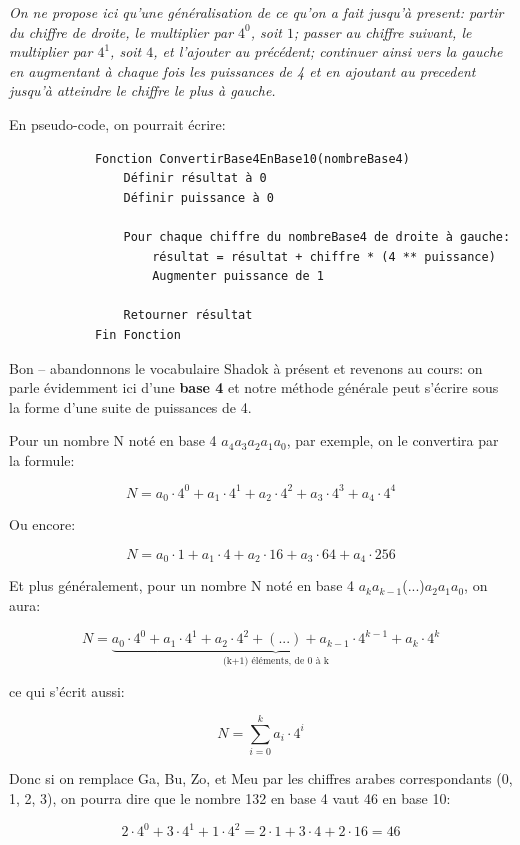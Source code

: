 \documentclass[12pt]{article}
\newenvironment{MaReponse}
		{\begin{greyedtextbox}\itshape} %
		{\end{greyedtextbox}}            %
\begin{document}
	\begin{MaReponse}
		On ne propose ici qu'une généralisation de ce qu'on a fait jusqu'à present: partir du chiffre de droite, le multiplier par $4^0$, soit $1$; passer au chiffre suivant, le multiplier par $4^1$, soit $4$, et l'ajouter au précédent; continuer ainsi vers la gauche en augmentant à chaque fois les puissances de 4 et en ajoutant au precedent jusqu'à atteindre le chiffre le plus à gauche.

		En pseudo-code, on pourrait écrire:
		
		\begin{verbatim}
			Fonction ConvertirBase4EnBase10(nombreBase4)
			    Définir résultat à 0
			    Définir puissance à 0
			
			    Pour chaque chiffre du nombreBase4 de droite à gauche:
			        résultat = résultat + chiffre * (4 ** puissance)
			        Augmenter puissance de 1
			
			    Retourner résultat
			Fin Fonction
		\end{verbatim}
	\end{MaReponse}
	
	Bon -- abandonnons le vocabulaire Shadok à présent et revenons au cours: on parle évidemment ici d'une \textbf{base 4} et notre méthode générale peut s'écrire sous la forme d'une suite de puissances de 4.
	
	Pour un nombre N noté en base 4 \( a_4 \)\( a_3 \)\( a_2 \)\( a_1 \)\( a_0 \), par exemple, on le convertira par la formule:
	
	\[ N = a_0 \cdot 4^0 + a_1 \cdot 4^1 + a_2 \cdot 4^2 + a_3 \cdot 4^3 + a_4 \cdot 4^4\]
	
	Ou encore:
	
	\[ N = a_0 \cdot 1 + a_1 \cdot 4 + a_2 \cdot 16 + a_3 \cdot 64 + a_4 \cdot 256\]
	
	Et plus généralement, pour un nombre N noté en base 4 \( a_k \)\( a_{k-1} \)(...)\( a_2 \)\( a_1 \)\( a_0 \), on aura:
	
	\[ N = \underbrace{a_0 \cdot 4^0 + a_1 \cdot 4^1 + a_2 \cdot 4^2 + (...) + a_{k-1} \cdot 4^{k-1} + a_k \cdot 4^k}_{\text{(k+1)\ éléments, de 0 à k}}\]
	
	ce qui s'écrit aussi:
	
	\[ N = \sum_{i=0}^{k} a_i \cdot 4^i \]
	
	Donc si on remplace Ga, Bu, Zo, et Meu par les chiffres arabes correspondants (0, 1, 2, 3), on pourra dire que le nombre 132 en base 4 vaut 46 en base 10:
	
	\[ 2 \cdot 4^0 + 3 \cdot 4^1 + 1 \cdot 4^2  = 2 \cdot 1 + 3 \cdot 4 + 2 \cdot 16 = 46\]
	
\end{document}

